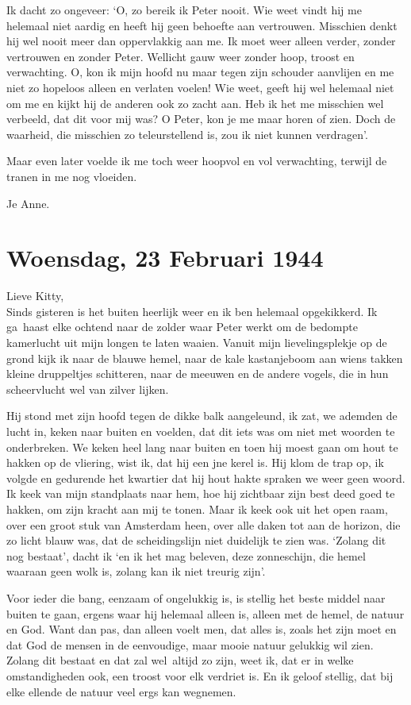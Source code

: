 \documentclass{book}
\begin{document}
Ik dacht zo ongeveer: `O, zo bereik ik Peter nooit. Wie weet vindt hij me
helemaal niet aardig en heeft hij geen behoefte aan vertrouwen.  Misschien denkt
hij wel nooit meer dan oppervlakkig aan me. Ik moet weer alleen verder, zonder
vertrouwen en zonder Peter. Wellicht gauw weer zonder hoop, troost en
verwachting. O, kon ik mijn hoofd nu maar tegen zijn schouder aanvlijen en me
niet zo hopeloos alleen en verlaten voelen! Wie weet, geeft hij wel helemaal
niet om me en kijkt hij de anderen ook zo zacht aan. Heb ik het me misschien wel
verbeeld, dat dit voor mij was? O Peter, kon je me maar horen of zien. Doch de
waarheid, die misschien zo teleurstellend is, zou ik niet kunnen verdragen'.

Maar even later voelde ik me toch weer hoopvol en vol verwachting, terwijl de
tranen in me nog vloeiden.

Je Anne.

\section*{Woensdag, 23 Februari 1944}

Lieve Kitty,\\
Sinds gisteren is het buiten heerlijk weer en ik ben helemaal
opgekikkerd. Ik ga~haast elke ochtend naar de zolder waar Peter werkt om de
bedompte kamerlucht uit mijn longen te laten waaien. Vanuit mijn
lievelingsplekje op de grond kijk ik naar de blauwe hemel, naar de kale
kastanjeboom aan wiens takken kleine druppeltjes schitteren, naar de meeuwen en
de andere vogels, die in hun scheervlucht wel van zilver lijken.

Hij stond met zijn hoofd tegen de dikke balk aangeleund, ik zat, we ademden de
lucht in, keken naar buiten en voelden, dat dit iets was om niet met woorden te
onderbreken. We keken heel lang naar buiten en toen hij moest gaan om hout te
hakken op de vliering, wist ik, dat hij een jne kerel is. Hij klom de trap op,
ik volgde en gedurende het kwartier dat hij hout hakte spraken we weer geen
woord. Ik keek van mijn standplaats naar hem, hoe hij zichtbaar zijn best deed
goed te hakken, om zijn kracht aan mij te tonen. Maar ik keek ook uit het open
raam, over een groot stuk van Amsterdam heen, over alle daken tot aan de
horizon, die zo licht blauw was, dat de scheidingslijn niet duidelijk te zien
was. `Zolang dit nog bestaat', dacht ik `en ik het mag beleven, deze
zonneschijn, die hemel waaraan geen wolk is, zolang kan ik niet treurig zijn'.

Voor ieder die bang, eenzaam of ongelukkig is, is stellig het beste middel naar
buiten te gaan, ergens waar hij helemaal alleen is, alleen met de hemel, de
natuur en God. Want dan pas, dan alleen voelt men, dat alles is, zoals het zijn
moet en dat God de mensen in de eenvoudige, maar mooie natuur gelukkig wil zien.
Zolang dit bestaat en dat zal wel~altijd zo zijn, weet ik, dat er in welke
omstandigheden ook, een troost voor elk verdriet is. En ik geloof stellig, dat
bij elke ellende de natuur veel ergs kan wegnemen.
\end{document}
